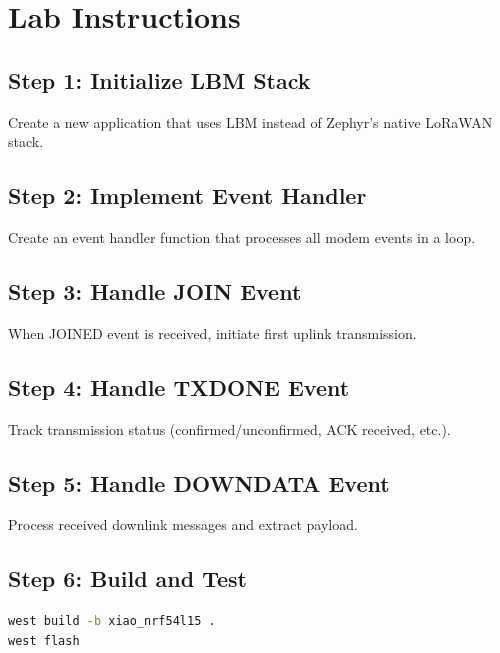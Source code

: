\documentclass[11pt,a4paper]{article}
\begin{document}
\section{Lab Instructions}

\subsection{Step 1: Initialize LBM Stack}

Create a new application that uses LBM instead of Zephyr's native LoRaWAN stack.

\subsection{Step 2: Implement Event Handler}

Create an event handler function that processes all modem events in a loop.

\subsection{Step 3: Handle JOIN Event}

When JOINED event is received, initiate first uplink transmission.

\subsection{Step 4: Handle TXDONE Event}

Track transmission status (confirmed/unconfirmed, ACK received, etc.).

\subsection{Step 5: Handle DOWNDATA Event}

Process received downlink messages and extract payload.

\subsection{Step 6: Build and Test}

\begin{lstlisting}[language=bash]
west build -b xiao_nrf54l15 .
west flash
\end{lstlisting}

\end{document}
